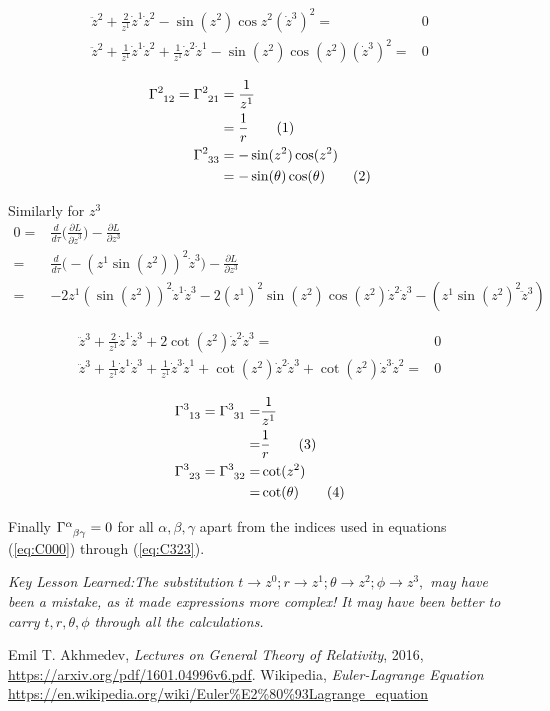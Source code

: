 \documentclass[]{article}
\newcommand\numberthis{\addtocounter{equation}{1}\tag{\theequation}}
\begin{document}
\begin{align*}
\ddot z^2 +\frac{2}{z^1} \dot z^1 \dot z^2 - \sin(z^2)\cos z^2 (\dot z^3)^2 =& 0\\
\ddot z^2 +\frac{1}{z^1} \dot z^1 \dot z^2 + \frac{1}{z^1}\dot z^2 \dot z^1 - \sin(z^2)\cos (z^2) (\dot z^3)^2 =& 0
\end{align*}

\begin{align*}
\Gamma\indices{^2_1_2} = \Gamma\indices{^2_2_1} &= \frac{1}{z^1}\\
&=\frac{1}{r} \numberthis \label{eq:C212}\\
\Gamma\indices{^2_3_3} &= -\sin(z^2)\cos (z^2)\\
& = -\sin(\theta)\cos(\theta) \numberthis \label{eq:C233}
\end{align*}

Similarly for $z^3$
\begin{align*}
0=&\frac{d}{d\tau}\big(\frac{\partial L}{\partial \dot z^3}\big)-\frac{\partial L}{\partial z^3}\\
=&\frac{d}{d\tau}\big(- (z^1 \sin (z^2))^2 \dot z^3\big)-\frac{\partial L}{\partial z^3}\\
=&-2 z^1 (\sin (z^2))^2 \dot z^1 \dot z^3-2(z^1)^2\sin(z^2)\cos(z^2)\dot z^2 \dot z^3-(z^1 \sin(z^2)^2 \ddot z^3)
\end{align*}

\begin{align*}
\ddot z^3 + \frac{2}{z^1} \dot z^1 \dot z^3 + 2  \cot(z^2) \dot z^2 \dot z^3 =& 0 \\
\ddot z^3 + \frac{1}{z^1} \dot z^1 \dot z^3 + \frac{1}{z^1} \dot z^3 \dot z^1 +  \cot(z^2) \dot z^2 \dot z^3 +  \cot(z^2) \dot z^3 \dot z^2=& 0
\end{align*}

\begin{align*}
\Gamma\indices{^3_1_3} = \Gamma\indices{^3_3_1} =& \frac{1}{z^1} \\
=& \frac{1}{r} \numberthis \label{eq:C313}\\
\Gamma\indices{^3_2_3} = \Gamma\indices{^3_3_2} =&  \cot(z^2)\\
 =&  \cot(\theta) \numberthis \label{eq:C323}
\end{align*}

Finally $\Gamma\indices{^\alpha_\beta_\gamma}=0$ for all $\alpha,\beta,\gamma$ apart from the indices used in equations (\ref{eq:C000}) through (\ref{eq:C323}).

\par\emph{Key Lesson Learned:The substitution $t\rightarrow z^0; r\rightarrow z^1; \theta\rightarrow z^2; \phi \rightarrow z^3,$ may have been a mistake, as it  made expressions more complex! It may have been better to carry $t,r,\theta,\phi$ through all the calculations.}

\begin{thebibliography}{9}
	
	Emil T. Akhmedev,
	\emph{Lectures on General Theory of Relativity},
	2016,
	\url{https://arxiv.org/pdf/1601.04996v6.pdf}.
	Wikipedia,
	\emph{Euler-Lagrange Equation}
	\url{https://en.wikipedia.org/wiki/Euler%E2%80%93Lagrange_equation}
\end{thebibliography}
\end{document}
